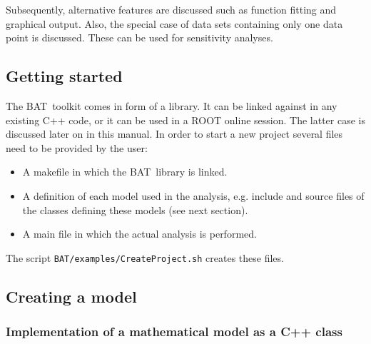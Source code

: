 \documentclass[11pt, a4paper]{article}
\newcommand{\BAT}{{\sc BAT}}
\begin{document}
\noindent 
Subsequently, alternative features are discussed such as function
fitting and graphical output. Also, the special case of data sets
containing only one data point is discussed. These can be used for
sensitivity analyses.


\subsection{Getting started} 
\label{subsection:start}

The \BAT\ toolkit comes in form of a library. It can be linked against
in any existing C++ code, or it can be used in a ROOT online
session. The latter case is discussed later on in this manual. In
order to start a new project several files need to be provided by the
user:
% 
\begin{itemize}
\item A makefile in which the \BAT\ library is linked. 
\item A definition of each model used in the analysis, e.g. include 
      and source files of the classes defining these models (see 
      next section).  
\item A main file in which the actual analysis is performed. 
\end{itemize} 

\noindent  
The script \verb|BAT/examples/CreateProject.sh| creates these files.


\subsection{Creating a model} 
\label{subsection:model}


\subsubsection{Implementation of a mathematical model as a C++ class} 
\label{subsubsection:implementation}
\end{document}
